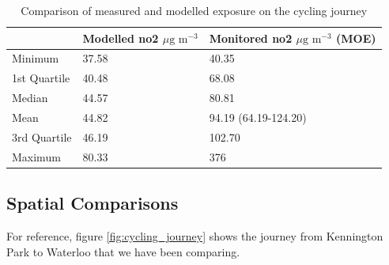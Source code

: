 \begin{table}[H]
\caption{Comparison of measured and modelled exposure on the cycling journey}
\centering
    \begin{tabular}{ | l | l | l |}
    \hline 
        & \bfseries{Modelled \gls{no2} $\mu \text{g m}^{-3}$} & \bfseries{Monitored \gls{no2} $\mu \text{g m}^{-3}$ (MOE)}                \\ \hline
     Minimum         & 37.58 & 40.35                \\ \hline
     1st Quartile    & 40.48 &  68.08               \\ \hline
     Median          & 44.57 & 80.81                \\ \hline
     Mean            & 44.82 & 94.19 (64.19-124.20) \\ \hline
     3rd Quartile    & 46.19 & 102.70               \\ \hline
     Maximum         & 80.33 & 376                  \\ \hline
    \end{tabular}
\label{tab:modelled_monitored_cycling_summary}
\end{table}

\subsection{Spatial Comparisons}
\label{subsec:spatialcomparisons}

For reference, figure \ref{fig:cycling_journey} shows the journey from Kennington Park to Waterloo that we have been comparing.

